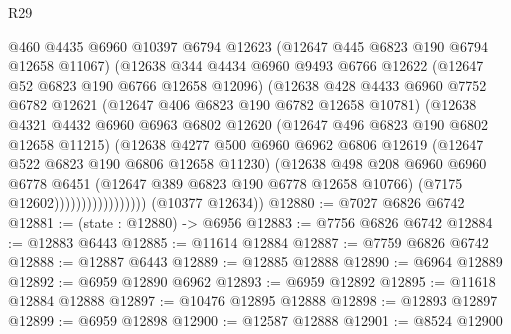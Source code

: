 \begin{lexlean}{R29}
\begin{coremodule}
                            @460
                            @4435
                            @6960
                            @10397
                            @6794
                            @12623
                            (@12647 @445 @6823 @190 @6794 @12658 @11067)
                            (@12638
                              @344
                              @4434
                              @6960
                              @9493
                              @6766
                              @12622
                              (@12647 @52 @6823 @190 @6766 @12658 @12096)
                              (@12638
                                @428
                                @4433
                                @6960
                                @7752
                                @6782
                                @12621
                                (@12647 @406 @6823 @190 @6782 @12658 @10781)
                                (@12638
                                  @4321
                                  @4432
                                  @6960
                                  @6963
                                  @6802
                                  @12620
                                  (@12647 @496 @6823 @190 @6802 @12658 @11215)
                                  (@12638
                                    @4277
                                    @500
                                    @6960
                                    @6962
                                    @6806
                                    @12619
                                    (@12647 @522 @6823 @190 @6806 @12658 @11230)
                                    (@12638
                                      @498
                                      @208
                                      @6960
                                      @6960
                                      @6778
                                      @6451
                                      (@12647 @389 @6823 @190 @6778 @12658 @10766)
                                      (@7175 @12602)))))))))))))))))
      (@10377 @12634))
@12880 := @7027 @6826 @6742
@12881 := (state : @12880) -> @6956
@12883 := @7756 @6826 @6742
@12884 := @12883 @6443
@12885 := @11614 @12884
@12887 := @7759 @6826 @6742
@12888 := @12887 @6443
@12889 := @12885 @12888
@12890 := @6964 @12889
@12892 := @6959 @12890 @6962
@12893 := @6959 @12892
@12895 := @11618 @12884 @12888
@12897 := @10476 @12895 @12888
@12898 := @12893 @12897
@12899 := @6959 @12898
@12900 := @12587 @12888
@12901 := @8524 @12900

\end{coremodule}
\end{lexlean}
